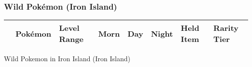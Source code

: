 \subsubsection{Wild Pokémon (Iron Island)}%
\label{ssubsec:WildPokmon(IronIsland)}%
\begin{longtable}{||l l l l l l l l||}%
\hline%
\rowcolor{gray}%
&Pokémon&Level Range&Morn&Day&Night&Held Item&Rarity Tier\\%
\hline%
\endhead%
\hline%
\end{longtable}%
\caption{Wild Pokemon in Iron Island (Iron Island)}
